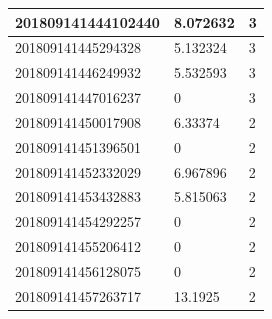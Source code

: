 \begin{table}[]
\begin{tabular}{|l|l|l|}
		201809141444102440      & 8.072632               & 3              \\ \hline
		201809141445294328      & 5.132324               & 3              \\ \hline
		201809141446249932      & 5.532593               & 3              \\ \hline
		\rowcolor[HTML]{FFCC67} 
		201809141447016237      & 0                      & 3              \\ \hline
		\rowcolor[HTML]{FE0000} 
		201809141450017908      & 6.33374                & 2              \\ \hline
		201809141451396501      & 0                      & 2              \\ \hline
		201809141452332029      & 6.967896               & 2              \\ \hline
		201809141453432883      & 5.815063               & 2              \\ \hline
		201809141454292257      & 0                      & 2              \\ \hline
		201809141455206412      & 0                      & 2              \\ \hline
		201809141456128075      & 0                      & 2              \\ \hline
		201809141457263717      & 13.1925                & 2              \\ \hline
	\end{tabular}
\end{table}

